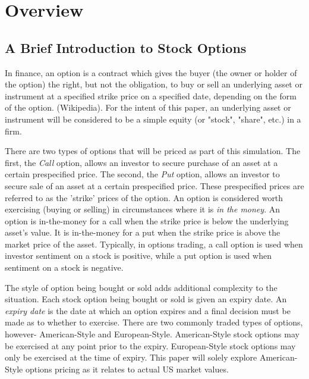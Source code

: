 
\chapter{Overview}
\section{A Brief Introduction to Stock Options} %

In finance, an option is a contract which gives the buyer (the owner or holder of the option) the right, but not the obligation, to buy or sell an underlying asset or instrument at a specified strike price on a specified date, depending on the form of the option. (Wikipedia). For the intent of this paper, an underlying asset or instrument will be considered to be a simple equity (or "stock", "share", etc.) in a firm. 

There are two types of options that will be priced as part of this simulation. The first, the \textit{Call} option, allows an investor to secure purchase of an asset at a certain prespecified price. The second, the \textit{Put} option, allows an investor to secure sale of an asset at a certain prespecified price. These prespecified prices are referred to as the 'strike' prices of the option. An option is considered worth exercising (buying or selling) in circumstances where it is \textit{in the money}. An option is in-the-money for a call when the strike price is below the underlying asset's value. It is in-the-money for a put when the strike price is above the market price of the asset. Typically, in options trading, a call option is used when investor sentiment on a stock is positive, while a put option is used when sentiment on a stock is negative. 

The style of option being bought or sold adds additional complexity to the situation. Each stock option being bought or sold is given an expiry date. An \textit{expiry date} is the date at which an option expires and a final decision must be made as to whether to exercise. There are two commonly traded types of options, however- American-Style and European-Style. American-Style stock options may be exercised at any point prior to the expiry. European-Style stock options may only be exercised at the time of expiry. This paper will solely explore American-Style options pricing as it relates to actual US market values.

